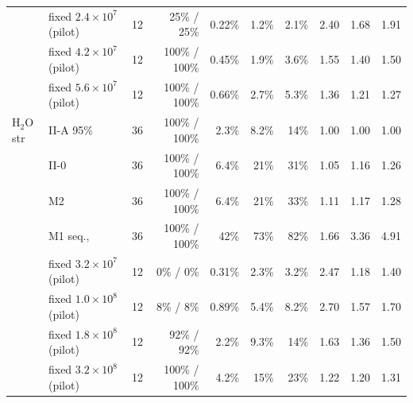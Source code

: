 \begin{table}[!htb]
{\begin{tabular}{llrrrrrrrr}
 & fixed $2.4\times10^{7}$ (pilot) & 12 & 25\% / 25\% & 0.22\% & 1.2\% & 2.1\% & 2.40 & 1.68 & 1.91 \\
 & fixed $4.2\times10^{7}$ (pilot) & 12 & 100\% / 100\% & 0.45\% & 1.9\% & 3.6\% & 1.55 & 1.40 & 1.50 \\
 & fixed $5.6\times10^{7}$ (pilot) & 12 & 100\% / 100\% & 0.66\% & 2.7\% & 5.3\% & 1.36 & 1.21 & 1.27 \\
\midrule
H$_2$O str & II-A 95\% & 36 & 100\% / 100\% & 2.3\% & 8.2\% & 14\% & 1.00 & 1.00 & 1.00 \\
 & II-0 & 36 & 100\% / 100\% & 6.4\% & 21\% & 31\% & 1.05 & 1.16 & 1.26 \\
 & M2 & 36 & 100\% / 100\% & 6.4\% & 21\% & 33\% & 1.11 & 1.17 & 1.28 \\
 & M1 seq., & 36 & 100\% / 100\% & 42\% & 73\% & 82\% & 1.66 & 3.36 & 4.91 \\
 & fixed $3.2\times10^{7}$ (pilot) & 12 & 0\% / 0\% & 0.31\% & 2.3\% & 3.2\% & 2.47 & 1.18 & 1.40 \\
 & fixed $1.0\times10^{8}$ (pilot) & 12 & 8\% / 8\% & 0.89\% & 5.4\% & 8.2\% & 2.70 & 1.57 & 1.70 \\
 & fixed $1.8\times10^{8}$ (pilot) & 12 & 92\% / 92\% & 2.2\% & 9.3\% & 14\% & 1.63 & 1.36 & 1.50 \\
 & fixed $3.2\times10^{8}$ (pilot) & 12 & 100\% / 100\% & 4.2\% & 15\% & 23\% & 1.22 & 1.20 & 1.31 \\
\bottomrule
\end{tabular}}
\end{table}
